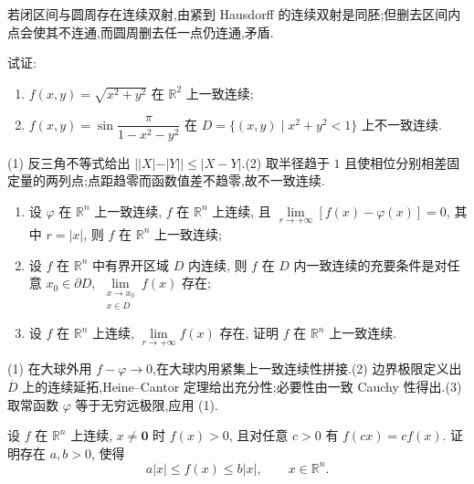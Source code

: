 \begin{solution}
    若闭区间与圆周存在连续双射,由紧到 Hausdorff 的连续双射是同胚;但删去区间内点会使其不连通,而圆周删去任一点仍连通,矛盾.
\end{solution}

\begin{example}
    试证:
    \begin{enumerate}
        \item $f(x,y)=\sqrt{x^2+y^2}$ 在 $\mathbb{R}^2$ 上一致连续;
        \item $\displaystyle f(x,y)=\sin\dfrac{\pi}{1-x^2-y^2}$ 在 $D=\{(x,y)\mid x^2+y^2<1\}$ 上不一致连续.
    \end{enumerate}
\end{example}
\exampleblank

\begin{solution}
    (1) 反三角不等式给出 $||X|-|Y||\leq|X-Y|$.(2) 取半径趋于 $1$ 且使相位分别相差固定量的两列点;点距趋零而函数值差不趋零,故不一致连续.
\end{solution}

\begin{example}
    \begin{enumerate}
        \item 设 $\varphi$ 在 $\mathbb{R}^n$ 上一致连续, $f$ 在 $\mathbb{R}^n$ 上连续, 且 $\displaystyle\lim\limits_{r\to+\infty}[f(x)-\varphi(x)]=0$, 其中 $r=|x|$, 则 $f$ 在 $\mathbb{R}^n$ 上一致连续;
        \item 设 $f$ 在 $\mathbb{R}^n$ 中有界开区域 $D$ 内连续, 则 $f$ 在 $D$ 内一致连续的充要条件是对任意 $x_0\in\partial D$, $\displaystyle\lim\limits_{\substack{x\to x_0\\x\in D}}f(x)$ 存在;
        \item 设 $f$ 在 $\mathbb{R}^n$ 上连续, $\displaystyle\lim\limits_{r\to+\infty}f(x)$ 存在, 证明 $f$ 在 $\mathbb{R}^n$ 上一致连续.
    \end{enumerate}
\end{example}
\exampleblank

\begin{solution}
    (1) 在大球外用 $f-\varphi\to0$,在大球内用紧集上一致连续性拼接.(2) 边界极限定义出 $\overline D$ 上的连续延拓,Heine--Cantor 定理给出充分性;必要性由一致 Cauchy 性得出.(3) 取常函数 $\varphi$ 等于无穷远极限,应用 (1).
\end{solution}

\begin{example}[\markstar]
    设 $f$ 在 $\mathbb{R}^n$ 上连续, $x\ne\bm{0}$ 时 $f(x)>0$, 且对任意 $c>0$ 有 $f(cx)=cf(x)$. 证明存在 $a,b>0$, 使得
    \[
        a|x|\leq f(x)\leq b|x|,
        \qquad x\in\mathbb{R}^n.
    \]
\end{example}
\exampleblank

